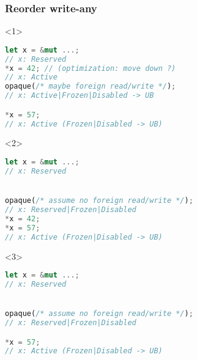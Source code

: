 \begin{frame}[fragile, t]
    \frametitle{{\cmark} Reorder write-any}
    \begin{onlyenv}<1>
        \begin{block}{}
            \begin{lstlisting}[language=rust, escapechar=@]
let x = &mut ...;
// x: Reserved
*x = 42; // (optimization: move down ?)
// x: Active
opaque(/* maybe foreign read/write */);
// x: Active|Frozen|Disabled -> UB

*x = 57;
// x: Active (Frozen|Disabled -> UB)
            \end{lstlisting}
        \end{block}
    \end{onlyenv}
    \begin{onlyenv}<2>
        \begin{block}{}
            \begin{lstlisting}[language=rust, escapechar=@]
let x = &mut ...;
// x: Reserved


opaque(/* assume no foreign read/write */);
// x: Reserved|Frozen|Disabled
*x = 42;
*x = 57;
// x: Active (Frozen|Disabled -> UB)
            \end{lstlisting}
        \end{block}
    \end{onlyenv}
    \begin{onlyenv}<3>
        \begin{block}{}
            \begin{lstlisting}[language=rust, escapechar=@]
let x = &mut ...;
// x: Reserved


opaque(/* assume no foreign read/write */);
// x: Reserved|Frozen|Disabled

*x = 57;
// x: Active (Frozen|Disabled -> UB)
            \end{lstlisting}
        \end{block}
    \end{onlyenv}

\end{frame}

